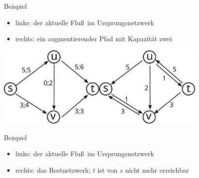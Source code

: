 \documentclass[aspectratio=1610, 11pt]{beamer}
\begin{document}
\begin{frame}
\begin{overprint}
\begin{exampleblock}{Beispiel}
			\begin{itemize}
				\item links: der aktuelle Flu\ss\ im Ursprungsnetzwerk
				\item rechts: ein augmentierender Pfad mit Kapazit\"at zwei
			\end{itemize}
		\end{exampleblock}
		\includegraphics[height=40mm]{./images/flow15.pdf}\hfill\includegraphics[height=40mm]{./images/flow16.pdf}
\begin{exampleblock}{Beispiel}
			\begin{itemize}
				\item links: der aktuelle Flu\ss\ im Ursprungsnetzwerk
				\item rechts: das Restnetzwerk; $t$ ist von $s$ nicht mehr erreichbar
			\end{itemize}
		\end{exampleblock}
	\end{overprint}
\end{frame}
\end{document}
